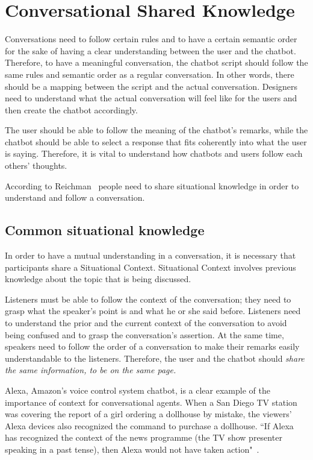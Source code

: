 \documentclass[a4paper,10pt]{article}
\begin{document}
\section{Conversational Shared Knowledge}

Conversations need to follow certain rules and to have a certain semantic order for the sake of having a clear understanding between the user and the chatbot. Therefore, to have a meaningful conversation, the chatbot script should follow the same rules and semantic order as a regular conversation. In other words, there should be a mapping between the script and the actual conversation. Designers need to understand what the actual conversation will feel like for the users and then create the chatbot accordingly. 

The user should be able to follow the meaning of the chatbot's remarks, while the chatbot should be able to select a response that fits coherently into what the user is saying. Therefore, it is vital to understand how chatbots and users follow each others' thoughts.

According to Reichman~\cite{reichman1985getting} people need to share situational knowledge in order to understand and follow a conversation.

\subsection{Common situational knowledge}
In order to have a mutual understanding in a conversation, it is necessary that participants share a Situational Context. Situational Context involves previous knowledge about the topic that is being discussed.  

Listeners must be able to follow the context of the conversation; they need to grasp what the speaker's point is and what he or she said before. Listeners need to understand the prior and the current context of the conversation to avoid being confused and to grasp the conversation's assertion. At the same time, speakers need to follow the order of a conversation to make their remarks easily understandable to the listeners. Therefore, the user and the chatbot should \textit{share the same information, to be on the same page.} 

Alexa, Amazon's voice control system chatbot, is a clear example of the importance of context for conversational agents. When  a San Diego TV station was covering the report of a girl ordering a dollhouse by mistake, the viewers' Alexa devices also recognized the command to purchase a dollhouse. ``If Alexa has recognized the context of the news programme (the TV show presenter speaking in a past tense), then Alexa would not have taken action"~\cite{WhatwecanlearnfromAlexasmistakes}.
\end{document}
